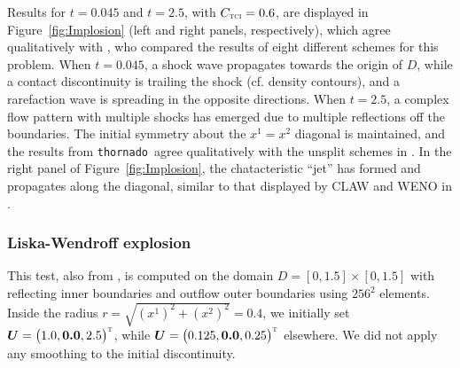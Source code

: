 \documentclass[letterpaper]{jpconf}
\newcommand{\vect}[1]{\boldsymbol{#1}}
\newcommand{\trans}{\textnormal{\tiny\textsc{T}}}
\newcommand{\TCI}{\textnormal{\tiny\textsc{TCI}}}
\newcommand{\thornado}{\texttt{thornado}}
\begin{document}
Results for $t=0.045$ and $t=2.5$, with $C_{\TCI}=0.6$, are displayed in Figure~\ref{fig:Implosion} (left and right panels, respectively), which agree qualitatively with \cite{liskaWendroff_2003}, who compared the results of eight different schemes for this problem.  
When $t=0.045$, a shock wave propagates towards the origin of $D$, while a contact discontinuity is trailing the shock (cf. density contours), and a rarefaction wave is spreading in the opposite directions.  
When $t=2.5$, a complex flow pattern with multiple shocks has emerged due to multiple reflections off the boundaries.  
The initial symmetry about the $x^{1}=x^{2}$ diagonal is maintained, and the results from \thornado\ agree qualitatively with the unsplit schemes in \cite{liskaWendroff_2003}.  
In the right panel of Figure~\ref{fig:Implosion}, the chatacteristic ``jet'' has formed and propagates along the diagonal, similar to that displayed by CLAW and WENO in \cite{liskaWendroff_2003}.  

\subsubsection{Liska-Wendroff explosion}

This test, also from \cite{liskaWendroff_2003}, is computed on the domain $D=[0,1.5]\times[0,1.5]$ with reflecting inner boundaries and outflow outer boundaries using $256^{2}$ elements.  
Inside the radius $r=\sqrt{(x^{1})^{2}+(x^{2})^{2}}=0.4$, we initially set $\vect{U}=\big(1.0,\vect{0.0},2.5\big)^{\trans}$, while $\vect{U}=\big(0.125,\vect{0.0},0.25\big)^{\trans}$ elsewhere.  
We did not apply any smoothing to the initial discontinuity.  
\end{document}
